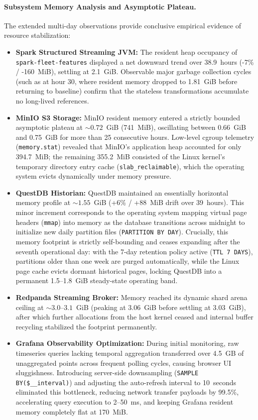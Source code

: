 \paragraph{Subsystem Memory Analysis and Asymptotic Plateau.}
The extended multi-day observations provide conclusive empirical evidence of resource stabilization:
\begin{itemize}
    \item \textbf{Spark Structured Streaming JVM:} The resident heap occupancy of \texttt{spark-fleet-features} displayed a net downward trend over 38.9~hours (-7\% / -160~MiB), settling at 2.1~GiB. Observable major garbage collection cycles (such as at hour 30, where resident memory dropped to 1.81~GiB before returning to baseline) confirm that the stateless transformations accumulate no long-lived references.
    \item \textbf{MinIO S3 Storage:} MinIO resident memory entered a strictly bounded asymptotic plateau at $\sim0.72$~GiB (741~MiB), oscillating between 0.66~GiB and 0.75~GiB for more than 25 consecutive hours. Low-level cgroup telemetry (\texttt{memory.stat}) revealed that MinIO's application heap accounted for only 394.7~MiB; the remaining 355.2~MiB consisted of the Linux kernel's temporary directory entry cache (\texttt{slab\_reclaimable}), which the operating system evicts dynamically under memory pressure.
    \item \textbf{QuestDB Historian:} QuestDB maintained an essentially horizontal memory profile at $\sim1.55$~GiB (+6\% / +88~MiB drift over 39~hours). This minor increment corresponds to the operating system mapping virtual page headers (\texttt{mmap}) into memory as the database transitions across midnight to initialize new daily partition files (\texttt{PARTITION BY DAY}). Crucially, this memory footprint is strictly self-bounding and ceases expanding after the seventh operational day: with the 7-day retention policy active (\texttt{TTL 7 DAYS}), partitions older than one week are purged automatically, while the Linux page cache evicts dormant historical pages, locking QuestDB into a permanent 1.5--1.8~GiB steady-state operating band.
    \item \textbf{Redpanda Streaming Broker:} Memory reached its dynamic shard arena ceiling at $\sim3.0\text{--}3.1$~GiB (peaking at 3.06~GiB before settling at 3.03~GiB), after which further allocations from the host kernel ceased and internal buffer recycling stabilized the footprint permanently.
    \item \textbf{Grafana Observability Optimization:} During initial monitoring, raw timeseries queries lacking temporal aggregation transferred over 4.5~GB of unaggregated points across frequent polling cycles, causing browser UI sluggishness. Introducing server-side downsampling (\texttt{SAMPLE BY(\$\_\_interval)}) and adjusting the auto-refresh interval to 10~seconds eliminated this bottleneck, reducing network transfer payloads by 99.5\%, accelerating query execution to 2--50~ms, and keeping Grafana resident memory completely flat at 170~MiB.

\end{itemize}
